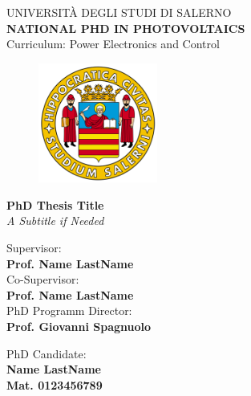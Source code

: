 \documentclass[b5paper, 10pt, twoside]{book}
\begin{document}
\begin{titlepage}
    \begin{center}
        \LARGE{\uppercase{Università degli Studi di Salerno}}\\
        \vspace{5mm}
        \large{\textbf{NATIONAL PHD IN PHOTOVOLTAICS}}\\
        \normalsize{Curriculum: Power Electronics and Control}
    \end{center}

    \vspace{10mm}
    \begin{figure}[H]
        \centering
        \includegraphics[width=0.35\textwidth]{logo_unisa}
    \end{figure}
    
    \vspace{10mm}
    \begin{center}
        {\Huge \bfseries PhD Thesis Title}\\
        \vspace{5mm}
        \Large{\textit{A Subtitle if Needed}}\\
        \vspace{10mm}
    \end{center}
    
    \noindent
    \begin{minipage}[t]{0.47\textwidth}
        {\large{Supervisor:\\ \bf Prof. Name LastName}}\\[8mm]
        {\large{Co-Supervisor:\\ \bf Prof. Name LastName}}\\[8mm]
        {\large{PhD Programm Director:\\ \bf Prof. Giovanni Spagnuolo}}
    \end{minipage}
    \hfill
    \begin{minipage}[t]{0.4\textwidth}\raggedleft
        {\large{PhD Candidate: \\ \bf Name LastName\\ Mat. 0123456789}}
    \end{minipage}
    
    \vfill
\end{titlepage}
\end{document}
